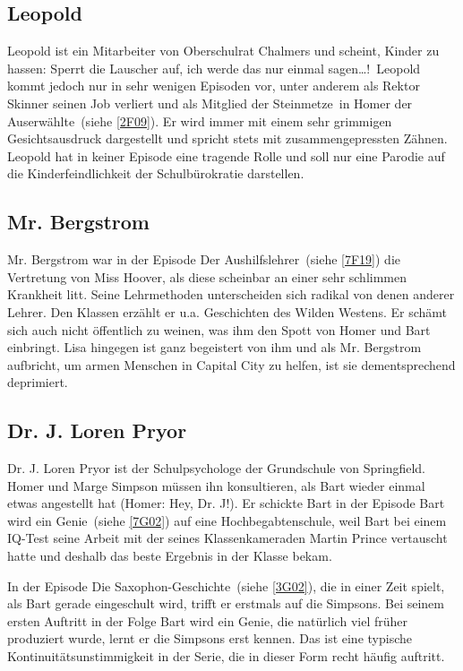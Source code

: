 \subsection{Leopold}
Leopold ist ein Mitarbeiter von Oberschulrat Chalmers und scheint, Kinder zu hassen: \glqq Sperrt die Lauscher auf, ich werde das nur einmal sagen\dots !\grqq\ Leopold kommt jedoch nur in sehr wenigen Episoden vor, unter anderem als Rektor Skinner seinen Job verliert und als Mitglied der \glqq Steinmetze\grqq\ in \glqq Homer der Auserwählte\grqq\ (siehe \ref{2F09}). Er wird immer mit einem sehr grimmigen Gesichtsausdruck dargestellt und spricht stets mit zusammengepressten Zähnen. Leopold hat in keiner Episode eine tragende Rolle und soll nur eine Parodie auf die Kinderfeindlichkeit der Schulbürokratie darstellen.

\subsection{Mr. Bergstrom}
Mr. Bergstrom war in der Episode \glqq Der Aushilfslehrer\grqq\ (siehe \ref{7F19}) die Vertretung von Miss Hoover, als diese scheinbar an einer sehr schlimmen Krankheit litt. Seine Lehrmethoden unterscheiden sich radikal von denen anderer Lehrer. Den Klassen erzählt er u.a. Geschichten des Wilden Westens. Er schämt sich auch nicht öffentlich zu weinen, was ihm den Spott von Homer und Bart einbringt. Lisa hingegen ist ganz begeistert von ihm und als Mr. Bergstrom aufbricht, um armen Menschen in Capital City zu helfen, ist sie dementsprechend deprimiert.

\subsection{Dr. J. Loren Pryor}
Dr. J. Loren Pryor ist der Schulpsychologe der Grundschule von Springfield. Homer und Marge Simpson müssen ihn konsultieren, als Bart wieder einmal etwas angestellt hat (Homer: \glqq Hey, Dr. J!\grqq ). Er schickte Bart in der Episode \glqq Bart wird ein Genie\grqq\ (siehe \ref{7G02}) auf eine Hochbegabtenschule, weil Bart bei einem IQ-Test seine Arbeit mit der seines Klassenkameraden Martin Prince vertauscht hatte und deshalb das beste Ergebnis in der Klasse bekam.

In der Episode \glqq Die Saxophon-Geschichte\grqq\ (siehe \ref{3G02}), die in einer Zeit spielt, als Bart gerade eingeschult wird, trifft er erstmals auf die Simpsons. Bei seinem ersten Auftritt in der Folge \glqq Bart wird ein Genie\grqq , die natürlich viel früher produziert wurde, lernt er die Simpsons erst kennen. Das ist eine typische Kontinuitätsunstimmigkeit in der Serie, die in dieser Form recht häufig auftritt.


